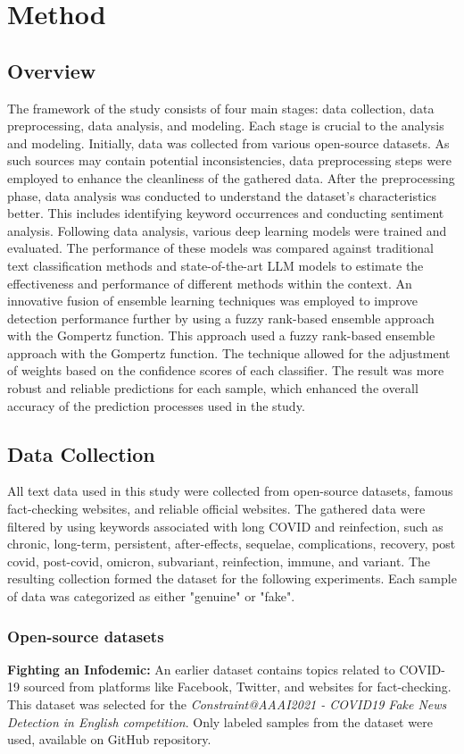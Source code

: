 \chapter{Method}
\label{ch:architecture}
\section{Overview}
The framework of the study consists of four main stages: data collection, data preprocessing, data analysis, and modeling. Each stage is crucial to the analysis and modeling. Initially, data was collected from various open-source datasets. As such sources may contain potential inconsistencies, data preprocessing steps were employed to enhance the cleanliness of the gathered data. After the preprocessing phase, data analysis was conducted to understand the dataset's characteristics better. This includes identifying keyword occurrences and conducting sentiment analysis. Following data analysis, various deep learning models were trained and evaluated. The performance of these models was compared against traditional text classification methods and state-of-the-art LLM models to estimate the effectiveness and performance of different methods within the context. An innovative fusion of ensemble learning techniques was employed to improve detection performance further by using a fuzzy rank-based ensemble approach with the Gompertz function. This approach used a fuzzy rank-based ensemble approach with the Gompertz function. The technique allowed for the adjustment of weights based on the confidence scores of each classifier. The result was more robust and reliable predictions for each sample, which enhanced the overall accuracy of the prediction processes used in the study.

\section{Data Collection}
All text data used in this study were collected from open-source datasets, famous fact-checking websites, and reliable official websites. The gathered data were filtered by using keywords associated with long COVID and reinfection, such as chronic, long-term, persistent, after-effects, sequelae, complications, recovery, post covid, post-covid, omicron, subvariant, reinfection, immune, and variant. The resulting collection formed the dataset for the following experiments. Each sample of data was categorized as either "genuine" or "fake".

\subsection{Open-source datasets}
\textbf{Fighting an Infodemic\cite{b4}:}
An earlier dataset contains topics related to COVID-19 sourced from platforms like Facebook, Twitter,  and websites for fact-checking. This dataset was selected for the \textit{Constraint@AAAI2021 - COVID19 Fake News Detection in English competition}. Only labeled samples from the dataset were used, available on GitHub repository\cite{b9}.\\


